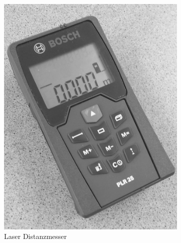 \begin{figure}[ht!]
         \centering
         \caption[Kalibrierwerkzeuge]{Werkzeuge die bei der Kalibrierung verwendet werden.}
         \begin{subfigure}[t]{0.4\textwidth}
                 \centering
                 \includegraphics[width=\textwidth]{img/Lasermeter.png}
                 \caption{Laser Distanzmesser}
                 \label{fig:laser_meter}
         \end{subfigure}
%
\qquad         
%
         \begin{subfigure}[t]{0.4\textwidth}
                 \centering

\end{subfigure}
\end{figure}
